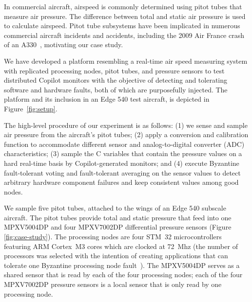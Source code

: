 









In commercial aircraft, airspeed is commonly determined using pitot tubes that
measure air pressure. The difference between total and static air pressure is
used to calculate airspeed. Pitot tube subsystems have been
implicated in numerous commercial aircraft incidents and accidents, including
the 2009 Air France crash of an A330~\cite{pitot}, motivating our case study.

We have developed a platform resembling a real-time air speed measuring system with
replicated processing nodes, pitot tubes, and pressure sensors to test distributed Copilot
monitors with the objective of detecting and tolerating software and hardware
faults, both of which are purposefully injected.  The platform and its inclusion
in an Edge 540 test aircraft, is depicted in Figure~\ref{fig:setup}.

The high-level procedure of our experiment is as follows: (1) we sense and
sample air pressure from the aircraft's pitot tubes; (2) apply a conversion and
calibration function to accommodate different sensor and analog-to-digital
converter (ADC) characteristics; (3) sample the C variables that contain the
pressure values on a hard real-time basis by Copilot-generated
monitors; and (4) execute Byzantine fault-tolerant voting and fault-tolerant
averaging on the sensor values to detect arbitrary hardware component failures
and keep consistent values among good nodes.

We sample five pitot tubes, attached to the wings of an Edge 540 subscale aircraft.
The pitot tubes provide total and static pressure that feed into
one MPXV5004DP and four MPXV7002DP differential pressure sensors (Figure \ref{fig:case-study}).
The processing nodes are four STM~32 microcontrollers featuring ARM Cortex~M3 cores which are clocked at
72~Mhz (the number of processors was selected with the intention of creating
applications that can tolerate one Byzantine processing node fault~\cite{lamport95byzantine}).
The MPXV5004DP serves as a shared sensor that is read by each of the four processing nodes;
each of the four MPXV7002DP pressure sensors is a local sensor that is only read by one processing
node.

